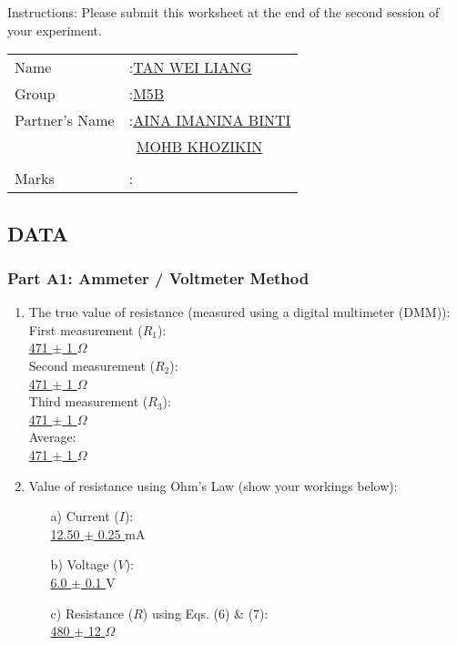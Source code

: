 \documentclass[twocolumn,a4paper,11pt]{article}
\begin{document}
Instructions: Please submit this worksheet at the end of the second session of your experiment.

\begin{tabular}{ll}
Name & :\underline{TAN WEI LIANG\hspace{0.95cm}} \\
Group & :\underline{M5B\hspace{3.3cm}} \\
Partner's Name & :\underline{AINA IMANINA BINTI} \\
          & \ \underline{MOHB KHOZIKIN\hspace{0.7cm}}\\
          & \\
Marks & :\underline{\hspace{4.2cm}} \\
\end{tabular}

\subsection*{DATA}

\subsubsection*{Part A1: Ammeter / Voltmeter Method}
\begin{enumerate}
    \item The true value of resistance (measured using a digital multimeter (DMM)): \\
    First measurement (\(R_1\)): \\
    \underline{ 471 $\pm$ 1 } \(\Omega\) \\
    Second measurement (\(R_2\)): \\
    \underline{ 471 $\pm$ 1 } \(\Omega\) \\
    Third measurement (\(R_3\)): \\
    \underline{ 471 $\pm$ 1 } \(\Omega\) \\
    Average: \\
    \underline{ 471 $\pm$ 1 } \(\Omega\)
    
    \item Value of resistance using Ohm's Law (show your workings below): 
    \begin{enumerate}
    \item[a)] Current (\(I\)): \\
    \underline{ 12.50 $\pm$ 0.25 }  mA 
    \item[b)] Voltage (\(V\)): \\
   \underline{ 6.0 $\pm$ 0.1 }  V 
   \item[c)] Resistance (\(R\)) using Eqs. (6) \& (7): \\
    \underline{ 480 $\pm$ 12 }  \(\Omega\)
    \end{enumerate}
\end{enumerate}
\newpage
\end{document}
